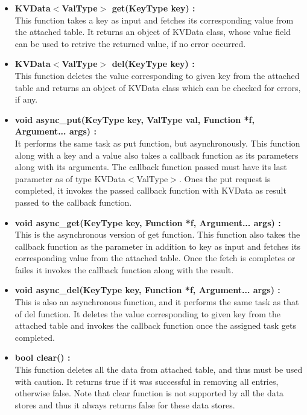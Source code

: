 \documentclass[11pt]{article}
\begin{document}
\begin{itemize}
\begin{itemize}
\item \textbf{KVData$<$ValType$>$ get(KeyType key) :}\\
This function takes a key as input and fetches its corresponding value from the attached table. It returns an object of KVData class, whose value field can be used to retrive the returned value, if no error occurred.\\

\item \textbf{KVData$<$ValType$>$ del(KeyType key) :}\\
This function deletes the value corresponding to given key from the attached table and returns an object of KVData class which can be checked for errors, if any.\\

\item \textbf{void async\_put(KeyType key, ValType val, Function *f, Argument... args) :}\\
It performs the same task as put function, but asynchronously.
This function along with a key and a value also takes a callback function as its parameters along with its arguments. The callback function passed must have its last parameter as of type KVData$<$ValType$>$. Ones the put request is completed, it invokes the passed callback function with KVData as result passed to the callback function.\\

\item \textbf{void async\_get(KeyType key, Function *f, Argument... args) :}\\
This is the asynchronous version of get function. This function also takes the callback function as the parameter in addition to key as input and fetches its corresponding value from the attached table. Once the fetch is completes or failes it invokes the callback function along with the result.\\

\item \textbf{void async\_del(KeyType key, Function *f, Argument... args) :}\\
This is also an asynchronous function, and it performs the same task as that of del function. It deletes the value corresponding to given key from the attached table and invokes the callback function once the assigned task gets completed.\\

\item \textbf{bool clear() :}\\
This function deletes all the data from attached table, and thus must be used with caution. It returns true if it was successful in removing all entries, otherwise false. Note that clear function is not supported by all the data stores and thus it always returns false for these data stores.
\end{itemize}



\end{itemize}
\end{document}
